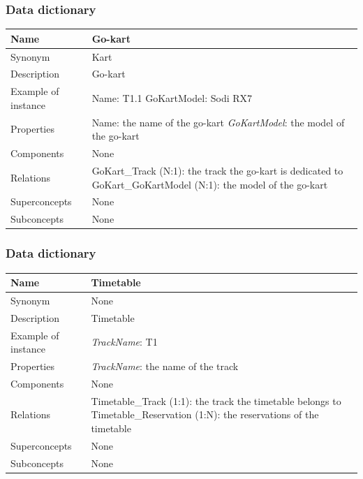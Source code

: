 \documentclass{beamer}
\begin{document}
\begin{frame}
\frametitle{Data dictionary}
\begin{table}
\tiny
\begin{tabular}{|p{2cm}|p{6cm}|}
\hline
Name & \textbf{Go-kart} \\
\hline
Synonym & Kart \\
\hline
Description & Go-kart \\
\hline
Example of instance &
Name: T1.1 \newline
GoKartModel: Sodi RX7 \\
\hline
Properties &
Name: the name of the go-kart \newline
\textit{GoKartModel}: the model of the go-kart \\
\hline
Components & None \\
\hline
Relations &
GoKart\_Track (N:1): the track the go-kart is dedicated to \newline
GoKart\_GoKartModel (N:1): the model of the go-kart \\
\hline
Superconcepts & None \\
\hline
Subconcepts & None \\
\hline
\end{tabular}
\end{table}
\end{frame}

\begin{frame}
\frametitle{Data dictionary}
\begin{table}
\tiny
\begin{tabular}{|p{2cm}|p{6cm}|}
\hline
Name & \textbf{Timetable} \\
\hline
Synonym & None \\
\hline
Description & Timetable \\
\hline
Example of instance &
\textit{TrackName}: T1 \\
\hline
Properties &
\textit{TrackName}: the name of the track \\
\hline
Components & None \\
\hline
Relations &
Timetable\_Track (1:1): the track the timetable belongs to \newline
Timetable\_Reservation (1:N): the reservations of the timetable \\
\hline
Superconcepts & None \\
\hline
Subconcepts & None \\
\hline
\end{tabular}
\end{table}
\end{frame}
\end{document}
